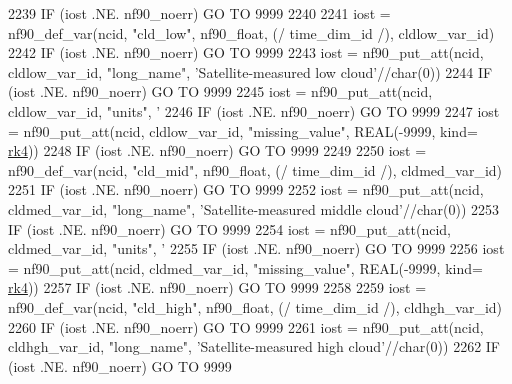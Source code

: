 \begin{DoxyCode}
{{2239     \textcolor{keywordflow}{IF} (iost .NE. nf90\_noerr) \textcolor{keywordflow}{GO TO} 9999
2240 
2241     iost    = nf90\_def\_var(ncid, \textcolor{stringliteral}{"cld\_low"}, nf90\_float, (/ time\_dim\_id /), cldlow\_var\_id)
2242     \textcolor{keywordflow}{IF} (iost .NE. nf90\_noerr) \textcolor{keywordflow}{GO TO} 9999
2243     iost    = nf90\_put\_att(ncid, cldlow\_var\_id, \textcolor{stringliteral}{"long\_name"}, \textcolor{stringliteral}{'Satellite-measured low cloud'}//char(0))
2244     \textcolor{keywordflow}{IF} (iost .NE. nf90\_noerr) \textcolor{keywordflow}{GO TO} 9999
2245     iost    = nf90\_put\_att(ncid, cldlow\_var\_id, \textcolor{stringliteral}{"units"}, \textcolor{stringliteral}{'%
2246     \textcolor{keywordflow}{IF} (iost .NE. nf90\_noerr) \textcolor{keywordflow}{GO TO} 9999
2247     iost    = nf90\_put\_att(ncid, cldlow\_var\_id, \textcolor{stringliteral}{"missing\_value"}, \textcolor{keywordtype}{REAL}(-9999, kind=
      \hyperlink{namespaceportable_abaed22a509442771d3fba69bebda0b33}{rk4}))
2248     \textcolor{keywordflow}{IF} (iost .NE. nf90\_noerr) \textcolor{keywordflow}{GO TO} 9999
2249 
2250     iost    = nf90\_def\_var(ncid, \textcolor{stringliteral}{"cld\_mid"}, nf90\_float, (/ time\_dim\_id /), cldmed\_var\_id)
2251     \textcolor{keywordflow}{IF} (iost .NE. nf90\_noerr) \textcolor{keywordflow}{GO TO} 9999
2252     iost    = nf90\_put\_att(ncid, cldmed\_var\_id, \textcolor{stringliteral}{"long\_name"}, \textcolor{stringliteral}{'Satellite-measured middle cloud'}//char(0))
2253     \textcolor{keywordflow}{IF} (iost .NE. nf90\_noerr) \textcolor{keywordflow}{GO TO} 9999
2254     iost    = nf90\_put\_att(ncid, cldmed\_var\_id, \textcolor{stringliteral}{"units"}, \textcolor{stringliteral}{'%
2255     \textcolor{keywordflow}{IF} (iost .NE. nf90\_noerr) \textcolor{keywordflow}{GO TO} 9999
2256     iost    = nf90\_put\_att(ncid, cldmed\_var\_id, \textcolor{stringliteral}{"missing\_value"}, \textcolor{keywordtype}{REAL}(-9999, kind=
      \hyperlink{namespaceportable_abaed22a509442771d3fba69bebda0b33}{rk4}))
2257     \textcolor{keywordflow}{IF} (iost .NE. nf90\_noerr) \textcolor{keywordflow}{GO TO} 9999
2258 
2259     iost    = nf90\_def\_var(ncid, \textcolor{stringliteral}{"cld\_high"}, nf90\_float, (/ time\_dim\_id /), cldhgh\_var\_id)
2260     \textcolor{keywordflow}{IF} (iost .NE. nf90\_noerr) \textcolor{keywordflow}{GO TO} 9999
2261     iost    = nf90\_put\_att(ncid, cldhgh\_var\_id, \textcolor{stringliteral}{"long\_name"}, \textcolor{stringliteral}{'Satellite-measured high cloud'}//char(0))
2262     \textcolor{keywordflow}{IF} (iost .NE. nf90\_noerr) \textcolor{keywordflow}{GO TO} 9999
}}}}
\end{DoxyCode}

